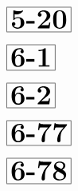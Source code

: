 \documentclass[a4paper, 10pt]{article}
\begin{document}
\begin{minipage}[t]{0.15\textwidth}
                \vspace*{-3.5cm}
        \hspace*{0.75cm}
        $\boxed{\textbf{\Huge5-20}}$
\end{minipage}
\begin{minipage}[t]{0.85\textwidth}
    
\end{minipage}

\begin{minipage}[t]{0.15\textwidth}
                \vspace*{-3.5cm}
        \hspace*{1.25cm}
        $\boxed{\textbf{\Huge6-1}}$
\end{minipage}
\begin{minipage}[t]{0.85\textwidth}
    
\end{minipage}

\begin{minipage}[t]{0.15\textwidth}
                \vspace*{-3.5cm}
        \hspace*{1.25cm}
        $\boxed{\textbf{\Huge6-2}}$
\end{minipage}
\begin{minipage}[t]{0.85\textwidth}
    
\end{minipage}

\begin{minipage}[t]{0.15\textwidth}
                \vspace*{-3.5cm}
        \hspace*{0.75cm}
        $\boxed{\textbf{\Huge6-77}}$
\end{minipage}
\begin{minipage}[t]{0.85\textwidth}
    
\end{minipage}

\begin{minipage}[t]{0.15\textwidth}
                \vspace*{-3.5cm}
        \hspace*{0.75cm}
        $\boxed{\textbf{\Huge6-78}}$
\end{minipage}
\begin{minipage}[t]{0.85\textwidth}
    
\end{minipage}
\end{document}
